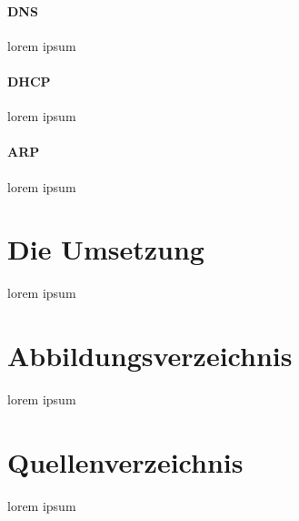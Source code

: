 \documentclass[10pt,a4paper,titlepage]{article}
\begin{document}
\paragraph{DNS}
lorem ipsum
\paragraph{DHCP}
lorem ipsum
\paragraph{ARP}
lorem ipsum
\section{Die Umsetzung}
lorem ipsum
\section{Abbildungsverzeichnis}
lorem ipsum
\section{Quellenverzeichnis}
lorem ipsum 
\end{document}
